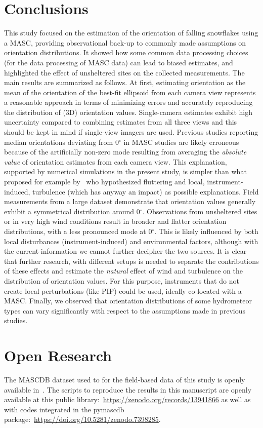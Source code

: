 \documentclass[draft]{agujournal2019}
\begin{document}
\section{Conclusions}
This study focused on the estimation of the orientation of falling snowflakes using a MASC, providing observational back-up to commonly made assumptions on orientation distributions. It showed how some common data processing choices (for the data processing of MASC data) can lead to biased estimates, and highlighted the effect of unsheltered sites on the collected measurements.
The main results are summarized as follows. 
At first, estimating orientation as the mean of the orientation of the best-fit ellipsoid from each camera view represents a reasonable approach in terms of minimizing errors and accurately reproducing the distribution of (3D) orientation values. Single-camera estimates exhibit high uncertainty compared to combining estimates from all three views and this should be kept in mind if single-view imagers are used. Previous studies reporting median orientations deviating from 0$^\circ$ in MASC studies are likely erroneous because of the artificially non-zero mode resulting from averaging the \textit{absolute value} of orientation estimates from each camera view. This explanation, supported by numerical simulations in the present study, is simpler than what proposed for example by~\cite{Garrett_GRL_2015} who hypothesized fluttering and local, instrument-induced, turbulence (which has anyway an impact) as possible explanations. 
Field measurements from a large dataset demonstrate that orientation values generally exhibit a symmetrical distribution around 0$^\circ$. Observations from unsheltered sites or in very high wind conditions result in broader and flatter orientation distributions, with a less pronounced mode at 0$^\circ$. This is likely influenced by both local disturbances (instrument-induced) and environmental factors, although with the current information we cannot further decipher the two sources.
It is clear that further research, with different setups is needed to separate the contributions of these effects and estimate the \textit{natural} effect of wind and turbulence on the distribution of orientation values. For this purpose, instruments that do not create local perturbations (like PIP) could be used, ideally co-located with a MASC.   Finally, we observed that orientation distributions of some hydrometeor types can vary significantly with respect to the assumptions made in previous studies.

\section{Open Research}
The MASCDB dataset used to for the field-based data of this study is openly available in~. The scripts to reproduce the results in this manuscript are openly available at this public library:~\url{https://zenodo.org/records/13941866} as well as with codes integrated in the pymascdb package:~\url{https://doi.org/10.5281/zenodo.7398285}.
\end{document}
